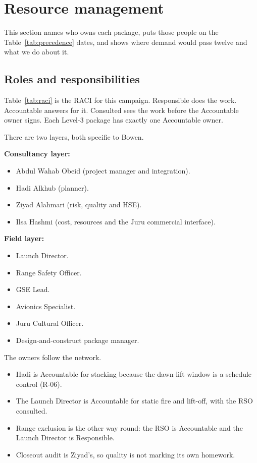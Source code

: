 \section{Resource management}
\label{sec:resource}

This section names who owns each package, puts those people on the Table~\ref{tab:precedence} dates, and shows where demand would pass twelve and what we do about it.

\subsection{Roles and responsibilities}
\label{sec:resource-raci}

Table~\ref{tab:raci} is the RACI for this campaign. Responsible does the work. Accountable answers for it. Consulted sees the work before the Accountable owner signs. Each Level-3 package has exactly one Accountable owner.

There are two layers, both specific to Bowen.

\textbf{Consultancy layer:}
\begin{itemize}[leftmargin=1.4em,itemsep=0.25em]
\item Abdul Wahab Obeid (project manager and integration).
\item Hadi Alkhub (planner).
\item Ziyad Alahmari (risk, quality and HSE).
\item Ilsa Hashmi (cost, resources and the Juru commercial interface).
\end{itemize}

\textbf{Field layer:}
\begin{itemize}[leftmargin=1.4em,itemsep=0.25em]
\item Launch Director.
\item Range Safety Officer.
\item GSE Lead.
\item Avionics Specialist.
\item Juru Cultural Officer.
\item Design-and-construct package manager.
\end{itemize}

The owners follow the network.
\begin{itemize}[leftmargin=1.4em,itemsep=0.25em]
\item Hadi is Accountable for stacking because the dawn-lift window is a schedule control (R-06).
\item The Launch Director is Accountable for static fire and lift-off, with the RSO consulted.
\item Range exclusion is the other way round: the RSO is Accountable and the Launch Director is Responsible.
\item Closeout audit is Ziyad's, so quality is not marking its own homework.
\end{itemize}


